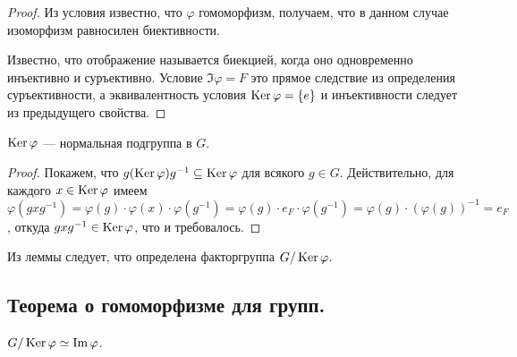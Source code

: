 \begin{properties}
\begin{enumerate}
        \begin{proof}
            Из условия известно, что $\varphi$ гомоморфизм, получаем, что
            в данном случае изоморфизм равносилен биективности. 
            
            Известно, что отображение
            называется биекцией, когда оно одновременно инъективно и суръективно.
            Условие $\Im \varphi = F$ это прямое следствие из определения суръективности,
            а эквивалентность условия $\operatorname{Ker} \varphi = \{e\}$ и инъективности 
            следует из предыдущего свойства.
        \end{proof}
    \end{enumerate}
\end{properties}


\begin{lemma}
    $\operatorname{Ker} \varphi$ --- нормальная подгруппа в $G$.
\end{lemma}
\begin{proof}
    Покажем, что $g(\operatorname{Ker} \varphi)g^{-1} \subseteq \operatorname{Ker} \varphi$
    для всякого $g \in G$. Действительно, для каждого
    $x \in \operatorname{Ker} \varphi$ имеем 
    $\varphi(gxg^{-1}) = \varphi(g)\cdot \varphi(x)\cdot \varphi(g^{-1}) =
    \varphi(g) \cdot e_F \cdot \varphi(g^{-1}) =
    \varphi(g) \cdot \left( \varphi(g) \right)^{-1} = e_F$, откуда
    $gxg^{-1} \in \operatorname{Ker} \varphi$, что и требовалось.
\end{proof}

Из леммы следует, что определена факторгруппа $G / \operatorname{Ker} \varphi$.
\newpage
\mysection
\subsection{Теорема о гомоморфизме для групп.}

\begin{theorem}
    $G / \operatorname{Ker} \varphi \simeq \operatorname{Im} \varphi$.
\end{theorem}

